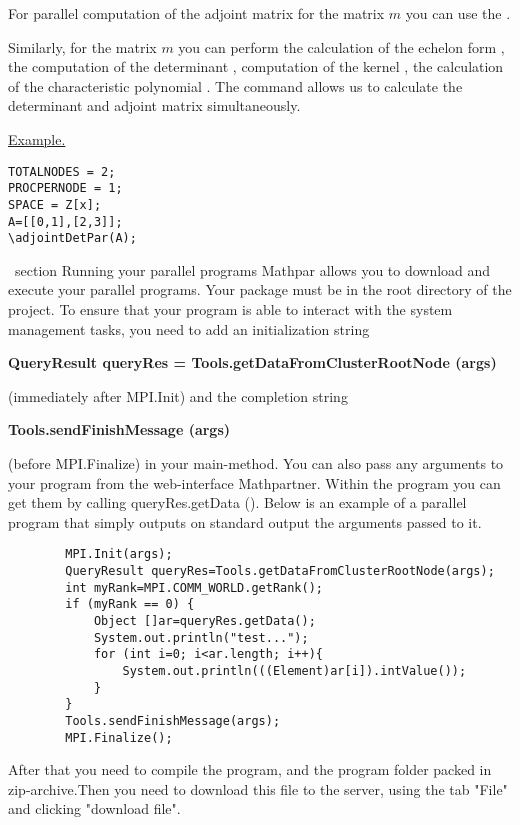   For parallel computation of the adjoint matrix for the matrix $ m $ you can use the 
  .  
 
  Similarly, for the matrix $ m $ you can perform the calculation of the echelon form , the computation of the determinant ,
computation of the kernel , the calculation of the characteristic polynomial . The command 
allows us to calculate the determinant and adjoint matrix simultaneously.

   \underline{Example. }
\begin{verbatim}
TOTALNODES = 2;
PROCPERNODE = 1;
SPACE = Z[x];
A=[[0,1],[2,3]];   
\adjointDetPar(A);
\end{verbatim}

\ section {Running your parallel programs}
Mathpar allows you to download and execute your parallel programs.
Your package must be in the root directory of the project.
To ensure that your program is able to interact with the system management tasks, 
you need to add an initialization string 

{\bf QueryResult queryRes = Tools.getDataFromClusterRootNode (args)}

\noindent
 (immediately after MPI.Init) and the completion string 

{\bf Tools.sendFinishMessage (args)}

\noindent
 (before MPI.Finalize) in your main-method.
You can also pass any arguments to your program from the web-interface Mathpartner. 
Within the program you can get them by calling queryRes.getData (). Below is an example of a 
parallel program that simply outputs on standard output the arguments passed to it.

\begin{verbatim}
        MPI.Init(args);
        QueryResult queryRes=Tools.getDataFromClusterRootNode(args);
        int myRank=MPI.COMM_WORLD.getRank();
        if (myRank == 0) {
            Object []ar=queryRes.getData();
            System.out.println("test...");           
            for (int i=0; i<ar.length; i++){
                System.out.println(((Element)ar[i]).intValue());
            }            
        }
        Tools.sendFinishMessage(args);
        MPI.Finalize();
\end{verbatim}

After that you need to compile the program, and the program folder packed in zip-archive.Then you need to download this file to the server, using the tab "File" and clicking "download file".
 
